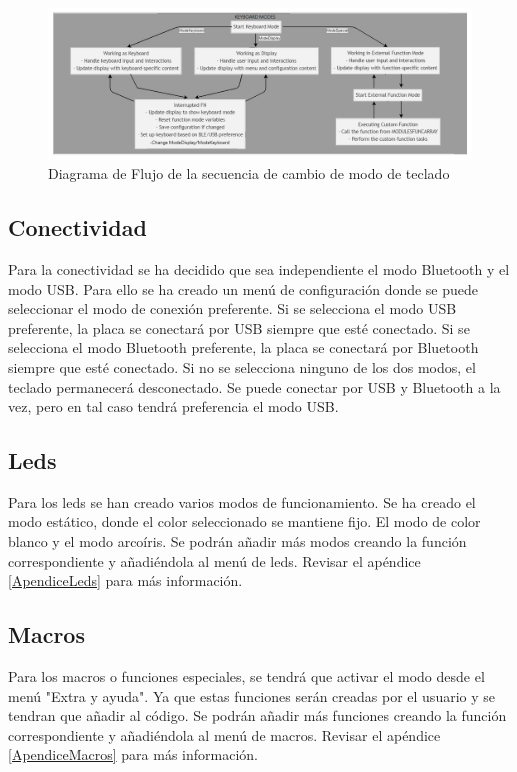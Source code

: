 \begin{figure}[H]
    \centering
    \includegraphics[width=1\textwidth]{imagenes/Capitulos/Cap07/EstadosKeyboard.png}
    \caption{Diagrama de Flujo de la secuencia de cambio de modo de teclado}
    \label{fig:EstadosKeyboard}
\end{figure}

\subsection{Conectividad}

Para la conectividad se ha decidido que sea independiente el modo Bluetooth y el modo USB. Para ello se ha creado un menú de configuración donde se puede seleccionar el modo de conexión preferente. Si se selecciona el modo USB preferente, la placa se conectará por USB siempre que esté conectado. Si se selecciona el modo Bluetooth preferente, la placa se conectará por Bluetooth siempre que esté conectado. Si no se selecciona ninguno de los dos modos, el teclado permanecerá desconectado. Se puede conectar por USB y Bluetooth a la vez, pero en tal caso tendrá preferencia el modo USB.

\subsection{Leds}

Para los leds se han creado varios modos de funcionamiento. Se ha creado el modo estático, donde el color seleccionado se mantiene fijo. El modo de color blanco y el modo arcoíris. Se podrán añadir más modos creando la función correspondiente y añadiéndola al menú de leds. Revisar el apéndice \ref{ApendiceLeds} para más información.

\subsection{Macros}

Para los macros o funciones especiales, se tendrá que activar el modo desde el menú "Extra y ayuda". Ya que estas funciones serán creadas por el usuario y se tendran que añadir al código. Se podrán añadir más funciones creando la función correspondiente y añadiéndola al menú de macros. Revisar el apéndice \ref{ApendiceMacros} para más información.

